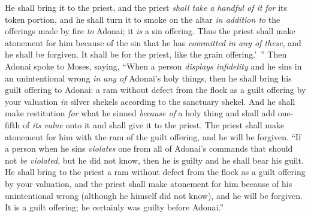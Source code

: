 \begin{biblechapter}
\verse He shall bring it to the priest, and the priest \textit{shall take a handful of it} \textit{for} its token portion, and he shall turn it to smoke on the altar \textit{in addition to} the offerings made by fire \textit{to} Adonai; it \textit{is} a sin offering.
\verse Thus the priest shall make atonement for him because of the sin that he has \textit{committed} \textit{in any of these}, and he shall be forgiven. It shall be for the priest, like the grain offering.’ ”
 Then Adonai spoke to Moses, saying,
\verse “When a person \textit{displays infidelity} and he sins in an unintentional wrong \textit{in any of} Adonai’s holy things, then he shall bring his guilt offering to Adonai: a ram without defect from the flock as a guilt offering by your valuation \textit{in} silver shekels according to the sanctuary shekel.
\verse And he shall make restitution \textit{for} what he sinned \textit{because of} a holy thing and shall add one-fifth of \textit{its value} onto it and shall give it to the priest. The priest shall make atonement for him with the ram of the guilt offering, and he will be forgiven.
\verse “If a person when he sins \textit{violates} one from all of Adonai’s commands that should not \textit{be violated}, but he did not know, then he is guilty and he shall bear his guilt.
\verse He shall bring to the priest a ram without defect from the flock as a guilt offering by your valuation, and the priest shall make atonement for him because of his unintentional wrong (although he himself did not know), and he will be forgiven.
\verse It is a guilt offering; he certainly was guilty before Adonai.”
\end{biblechapter}

